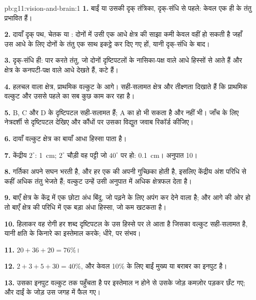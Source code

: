 \begin{solution}{pb:g11:vision-and-brain:1}
\textbf{1.} बाईं  या उसकी दृक् तंत्रिका, दृक्-संधि से पहले: केवल एक ही  के
तंतु प्रभावित हैं।

\textbf{2.} दायाँ दृक् पथ, चेतक या : दोनों  में उसी एक
आधे क्षेत्र की साझा कमी केवल वहीं हो सकती है जहाँ उस आधे के लिए दोनों 
के तंतु एक साथ इकट्ठे कर दिए गए हों, यानी दृक्-संधि के बाद।

\textbf{3.} दृक्-संधि ही: पार करते तंतु, जो दोनों दृष्टिपटलों के नासिका-पक्ष वाले
आधे हिस्सों से आते हैं और क्षेत्र के कनपटी-पक्ष वाले आधे देखते हैं, कटे हैं।

\textbf{4.} हलचल वाला क्षेत्र, प्राथमिक वल्कुट के आगे। सही-सलामत क्षेत्र और
तीक्ष्णता दिखाते हैं कि प्राथमिक वल्कुट और उससे पहले का सब कुछ काम कर रहा है।

\textbf{5.} B, C और D के दृष्टिपटल सही-सलामत हैं; A का हो भी सकता है और नहीं
भी। जाँच के लिए नेत्रदर्शी से दृष्टिपटल देखिए और कौंधों पर उसका विद्युत
जवाब रिकॉर्ड कीजिए।

\textbf{6.} दायाँ वल्कुट क्षेत्र का बायाँ आधा हिस्सा पाता है।

\textbf{7.} केंद्रीय $2^\circ$: \qty{1}{cm}; $2^\circ$ चौड़ी वह पट्टी जो
$40^\circ$ पर हो: \qty{0.1}{cm}। अनुपात 10।

\textbf{8.} गर्तिका अपने  सघन भरती है, और हर एक की अपनी गुच्छिका 
होती है, इसलिए केंद्रीय अंश परिधि से कहीं अधिक तंतु भेजते हैं; वल्कुट उन्हें
उसी अनुपात में अधिक क्षेत्रफल देता है।

\textbf{9.} बाएँ क्षेत्र के केंद्र में एक छोटा अंध बिंदु, जो पढ़ने के लिए
अपंग कर देने वाला है; और आगे की ओर हो तो बाएँ क्षेत्र की परिधि में एक बड़ा
अंधा हिस्सा, जो कम खटकता है।

\textbf{10.}  हिलाकर वह रोगी हर शब्द दृष्टिपटल के उस हिस्से पर ले आता
है जिसका वल्कुट सही-सलामत है, यानी क्षति के किनारे का इस्तेमाल करके; धीरे,
पर संभव।

\textbf{11.} $20 + 36 + 20 = 76\%$।

\textbf{12.} $2 + 3 + 5 + 30 = 40\%$, और केवल 10\% के लिए बाईं  मुख्य या
बराबर का इनपुट है।

\textbf{13.} उसका इनपुट वल्कुट तक पहुँचता है पर इस्तेमाल न होने से उसके जोड़
कमज़ोर पड़कर छँट गए; और दाईं  के जोड़ उस जगह में फैल गए।


\end{solution}
